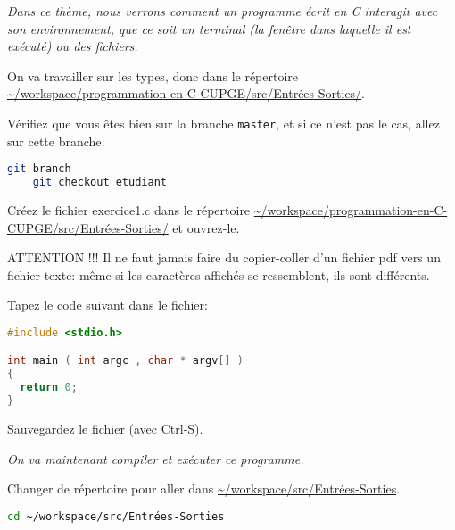 \titre{\tio}


\begin{center}
  \parbox{0.9\textwidth}{%
    \sl Dans ce thème, nous verrons comment un programme écrit en C
    interagit avec son environnement, que ce soit un terminal (la
    fenêtre dans laquelle il est exécuté) ou des fichiers.
  }
\end{center}

On va travailler sur les types, donc dans le répertoire \url{~/workspace/programmation-en-C-CUPGE/src/Entrées-Sorties/}.

\question Vérifiez que vous êtes bien sur la branche
\texttt{master}, et si ce n'est pas le cas, allez sur cette branche.

\begin{solution}
  \begin{lstlisting}[language=bash]
    git branch
    git checkout etudiant
  \end{lstlisting}
\end{solution}

\question Créez le fichier exercice1.c dans le répertoire \expandafter\url{~/workspace/programmation-en-C-CUPGE/src/Entrées-Sorties/} et
ouvrez-le.

\begin{fminipage}{\textwidth}
  ATTENTION !!! Il ne faut jamais faire du copier-coller d'un fichier pdf vers un
  fichier texte: même si les caractères affichés se ressemblent, ils
  sont différents.
\end{fminipage}


\question Tapez le code suivant dans le fichier:
\begin{lstlisting}[language=C]
#include <stdio.h>

int main ( int argc , char * argv[] )
{
  return 0;
}
\end{lstlisting}

\question Sauvegardez le fichier (avec Ctrl-S). 

\begin{center}
  \sl On va maintenant compiler et exécuter ce programme.
\end{center}

\question Changer de répertoire pour aller dans \url{~/workspace/src/Entrées-Sorties}.
\begin{solution}
  \begin{lstlisting}[language=bash]
    cd ~/workspace/src/Entrées-Sorties
  \end{lstlisting}
\end{solution}

